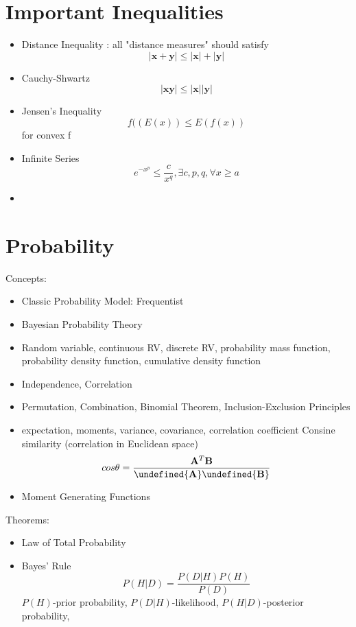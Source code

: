 \documentclass[11pt, openany]{book}              %
\let\norm\undefined %
\DeclarePairedDelimiter\norm{\lVert}{\rVert}
\begin{document}
\section{Important Inequalities}
\begin{itemize}
\item Distance Inequality : all "distance measures" should satisfy $$ |\mathbf{x} + \mathbf{y}| \leq |\mathbf{x}| + |\mathbf{y}|$$
\item Cauchy-Shwartz $$|\mathbf{xy}| \leq |\mathbf{x}||\mathbf{y}|$$
\item Jensen's Inequality $$f((E(x)) \leq E(f(x))$$ for convex f
\item Infinite Series $$ e^{-x^p} \leq \frac{c}{x^q}, \exists c,p,q, \forall x \geq a$$ 
\item 
\end{itemize}



\section{Probability}

Concepts:

\begin{itemize}
    \item Classic Probability Model: Frequentist 
    \item Bayesian Probability Theory 
    \item Random variable, continuous RV, discrete RV, probability mass function, probability density function, cumulative density function
    \item Independence, Correlation
    \item Permutation, Combination, Binomial Theorem, Inclusion-Exclusion Principles
    \item expectation, moments, variance, covariance, correlation coefficient
    	\subitem Consine similarity (correlation in Euclidean space)
    	  $$cos\theta = \frac{\mathbf{A}^T\mathbf{B}}{\norm{\mathbf{A}}\norm{\mathbf{B}}}	$$
    \item Moment Generating Functions 
\end{itemize}


Theorems:

\begin{itemize}
    \item Law of Total Probability
    \item Bayes' Rule $$P(H|D) = \frac{P(D|H) P(H)}{P(D)}$$ $P(H)$-prior probability, $P(D|H)$-likelihood, $P(H|D)$-posterior probability,
\end{itemize}
\end{document}
